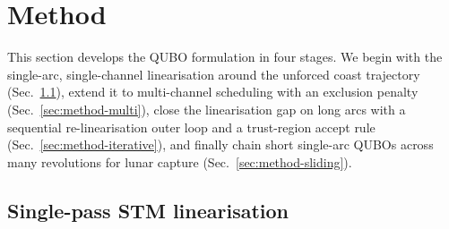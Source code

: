 \documentclass[11pt,a4paper]{article}
\theoremstyle{plain}
\begin{document}
\section{Method}

This section develops the QUBO formulation in four stages. We begin
with the single-arc, single-channel linearisation around the
unforced coast trajectory (Sec.~\ref{sec:method-single}), extend it
to multi-channel scheduling with an exclusion penalty
(Sec.~\ref{sec:method-multi}), close the linearisation gap on long
arcs with a sequential re-linearisation outer loop and a
trust-region accept rule (Sec.~\ref{sec:method-iterative}), and
finally chain short single-arc QUBOs across many revolutions for
lunar capture (Sec.~\ref{sec:method-sliding}).

\subsection{Single-pass STM linearisation}\label{sec:method-single}
\end{document}
